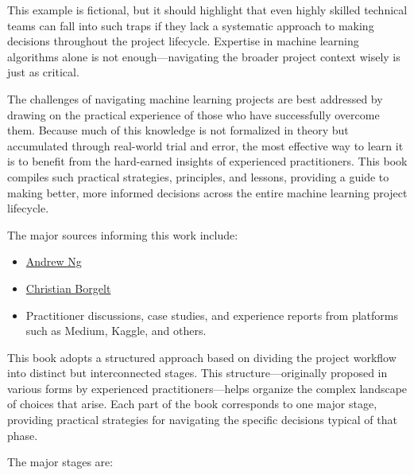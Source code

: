 \documentclass[12pt,openany, draft]{book}
\begin{document}
This example is fictional, but it should highlight that even highly skilled technical teams can fall into such traps if they lack a systematic approach to making decisions throughout the project lifecycle. Expertise in machine learning algorithms alone is not enough—navigating the broader project context wisely is just as critical. \newline

The challenges of navigating machine learning projects are best addressed by drawing on the practical experience of those who have successfully overcome them. Because much of this knowledge is not formalized in theory but accumulated through real-world trial and error, the most effective way to learn it is to benefit from the hard-earned insights of experienced practitioners. This book compiles such practical strategies, principles, and lessons, providing a guide to making better, more informed decisions across the entire machine learning project lifecycle. \newline

The major sources informing this work include:

\begin{itemize}
    \item \href{https://www.linkedin.com/in/andrewyng/}{Andrew Ng}
    \item \href{https://www.plus.ac.at/aihi/der-fachbereich/team/dipl-inform-dr-ing-christian-borgelt/}{Christian Borgelt}
    \item Practitioner discussions, case studies, and experience reports from platforms such as Medium, Kaggle, and others.
\end{itemize}

This book adopts a structured approach based on dividing the project workflow into distinct but interconnected stages. This structure—originally proposed in various forms by experienced practitioners—helps organize the complex landscape of choices that arise. Each part of the book corresponds to one major stage, providing practical strategies for navigating the specific decisions typical of that phase. \newline

The major stages are:
\end{document}
